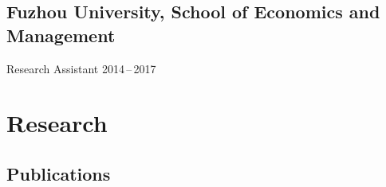 \documentclass[11 pt,letterpaper]{article}
\renewenvironment{itemize}{
	\begin{list}{}{
			\setlength{\leftmargin}{1.5em}
		}
	}{
	\end{list}
}
\begin{document}
	\subsection*{Fuzhou University, School of Economics and Management}
	
	\begin{itemize}
		\item[-] Research Assistant 
		\hfill    2014\,--\,2017
		
	\end{itemize}
	
	
	\section*{\textbf{Research}}
	
		\subsection*{\textbf{Publications}}
		
\end{document}
